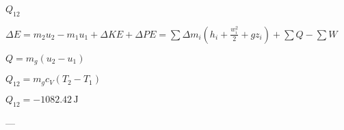 \( Q_{12} \)  

\( \Delta E = m_2 u_2 - m_1 u_1 + \Delta KE + \Delta PE = \sum \Delta m_i (h_i + \frac{w_i^2}{2} + g z_i) + \sum Q - \sum W \)  

\( Q = m_g (u_2 - u_1) \)  

\( Q_{12} = m_g c_V (T_2 - T_1) \)  

\( Q_{12} = -1082.42 \, \text{J} \)  

---